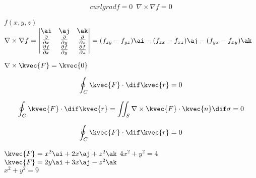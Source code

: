 \begin{align}
curl grad f=0\,\,\,\nabla\times\nabla f=0
\end{align}

\(f(x,y,z)\)\\
\(\nabla\times\nabla f=\begin{vmatrix}
\ai&\aj&\ak\\
\frac{\partial}{\partial x}&\frac{\partial}{\partial y}&\frac{\partial}{\partial z}\\
\frac{\partial f}{\partial x}&\frac{\partial f}{\partial y}&\frac{\partial f}{\partial z}
\end{vmatrix}=(f_{zy}-f_{yz})\ai-(f_{zx}-f_{xz})\aj-(f_{yx}-f_{xy})\ak\)











































\(\nabla \times \kvec{F}=\kvec{0}\)

\begin{align*}
\oint_C \kvec{F}\cdot \dif\kvec{r}=0
\end{align*}

\begin{align*}
\oint_C \kvec{F}\cdot \dif\kvec{r}=\iint_S \nabla \times\kvec{F}\cdot\kvec{n}\dif\sigma=0
\end{align*}

\begin{align*}
\oint_C \kvec{F} \cdot\dif \kvec{r} =0
\end{align*}


\(\kvec{F}= x^2 \ai + 2x \aj + z^2 \ak \) 
\(4x^2 +y^2 =4\) \\

\(\kvec{F}= 2y \ai + 3x \aj - z^2 \ak \) \\
\(x^2 +y^2 =9\)\\

